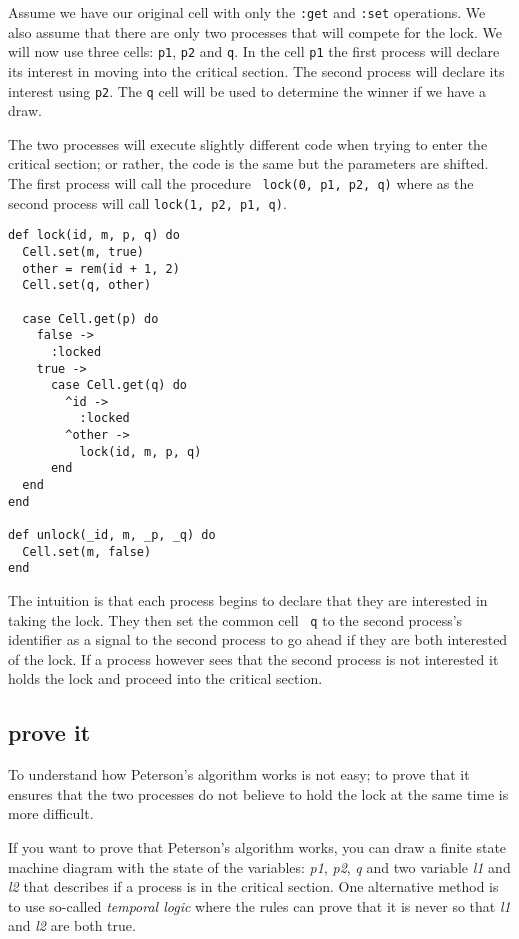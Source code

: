 \documentclass[a4paper,11pt]{article}
\begin{document}
Assume we have our original cell with only the {\tt :get} and {\tt :set}
operations. We also assume that there are only two processes that will
compete for the lock. We will now use three cells: {\tt p1}, {\tt p2}
and {\tt q}. In the cell {\tt p1} the first process will declare its
interest in moving into the critical section. The second process will
declare its interest using {\tt p2}. The {\tt q} cell will be used to
determine the winner if we have a draw.

The two processes will execute slightly different code when trying to
enter the critical section; or rather, the code is the same but the
parameters are shifted. The first process will call the procedure {\tt
  lock(0, p1, p2, q)} where as the second process will call {\tt lock(1, p2, p1, q)}.

\pagebreak

\begin{verbatim}
def lock(id, m, p, q) do
  Cell.set(m, true)
  other = rem(id + 1, 2)
  Cell.set(q, other)

  case Cell.get(p) do
    false ->
      :locked
    true ->
      case Cell.get(q) do
        ^id ->
          :locked
        ^other ->
          lock(id, m, p, q)
      end
  end
end

def unlock(_id, m, _p, _q) do
  Cell.set(m, false)
end
\end{verbatim}

The intuition is that each process begins to declare that they are
interested in taking the lock. They then set the common cell {\tt
  q} to the second process's identifier as a signal to the second
process to go ahead if they are both interested of the lock. If a
process however sees that the second process is not interested it
holds the lock and proceed into the critical section.


\subsection{prove it}

To understand how Peterson's algorithm works is not easy; to prove
that it ensures that the two processes do not believe to hold the
lock at the same time is more difficult. 
  
If you want to prove that Peterson's algorithm works, you can draw a
finite state machine diagram with the state of the variables: {\em
  p1}, {\em p2}, {\em q} and two variable {\em l1} and {\em l2} that
describes if a process is in the critical section. One alternative
method is to use so-called {\em temporal logic} where the rules can
prove that it is never so that {\em l1} and {\em l2} are both true.
\end{document}
